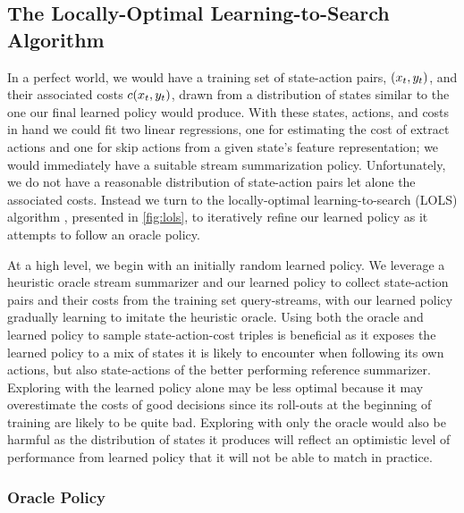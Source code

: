 

\subsection{The Locally-Optimal Learning-to-Search Algorithm}
\label{sec:algorithm}

In a perfect world, we would have a training set of state-action pairs,
$(x_t,y_t)$, and their associated costs $c(x_t, y_t)$,
drawn from a distribution of states similar to the one our final learned policy
would produce.  With these states, actions, and costs in hand we could fit two
linear regressions, one for estimating the cost of extract actions and one for
skip actions from a given state's feature representation; we would immediately
have a suitable stream summarization policy. Unfortunately, we do not have a
reasonable distribution of state-action pairs let alone the associated costs.
Instead we turn to the locally-optimal learning-to-search (LOLS) algorithm
\citep{chang2015}, presented in \autoref{fig:lols}, to iteratively refine our
learned policy as it attempts to follow an oracle policy. 

At a high level, we begin with an initially random learned policy.  We leverage
a heuristic oracle stream summarizer and our learned policy to collect
state-action pairs and their costs from the training set query-streams, with
our learned policy gradually learning to imitate the heuristic oracle. Using
both the oracle and learned policy to sample state-action-cost triples is
beneficial as it exposes the learned policy to a mix of states it is likely to
encounter when following its own actions, but also state-actions of the better
performing reference summarizer. Exploring with the learned policy alone may be
less optimal because it may overestimate the costs of good decisions since its
roll-outs at the beginning of training are likely to be quite bad.  Exploring
with only the oracle would also be harmful as the distribution of states it
produces will reflect an optimistic level of performance from learned policy
that it will not be able to match in practice.

\subsubsection{Oracle Policy}

